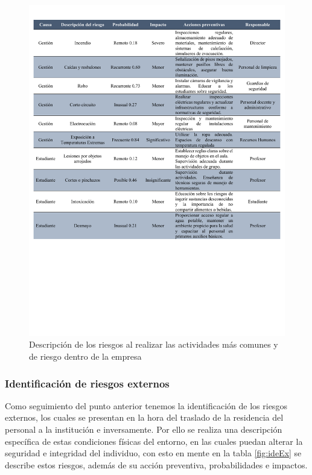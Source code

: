     \begin{figure}[H] 
        \centering
        \includegraphics[trim = {1mm 70mm 1mm 10mm},clip,scale=0.38]{22/Img/riesgosInternos.pdf}
        \caption{Descripción de los riesgos al realizar las actividades más comunes y de riesgo dentro de la empresa}
        \label{fig:ideIn}
    \end{figure}
    
    \subsubsection{Identificación de riesgos externos}
    
    Como seguimiento del punto anterior tenemos la identificación de los riesgos externos, los cuales se presentan en la hora del traslado de la residencia del personal a la institución e inversamente. Por ello se realiza una descripción específica de estas condiciones físicas del entorno, en las cuales puedan alterar la seguridad e integridad del individuo, con esto en mente en la tabla \ref{fig:ideEx}  se describe estos riesgos, además de su acción preventiva, probabilidades e impactos.
    
